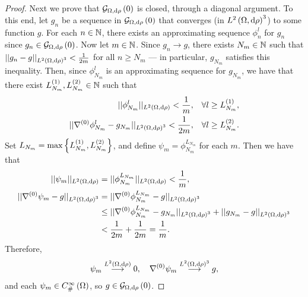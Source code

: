 \begin{proof}
	Next we prove that $\mathcal{G}_{ \Omega, \mathrm{d}\rho}\left( 0 \right)$ is closed, through a diagonal argument.
	To this end, let $g_n$ be a sequence in $\mathcal{G}_{ \Omega, \mathrm{d}\rho}\left( 0 \right)$ that converges (in $L^{2}\left( \Omega,\mathrm{d} \rho \right)^3$) to some function $g$.
	For each $n\in\mathbb{N}$, there exists an approximating sequence $\phi_n^l$ for $g_n$ since $g_n\in\mathcal{G}_{ \Omega, \mathrm{d}\rho}\left( 0 \right)$.
	Now let $m\in\mathbb{N}$.
	Since $g_n\rightarrow g$, there exists $N_m\in\mathbb{N}$ such that $\lvert\lvert g_n-g \rvert\rvert_{L^{2}\left( \Omega,\mathrm{d} \rho \right)^3}<\frac{1}{2m}$ for all $n\geq N_m$ --- in particular, $g_{N_m}$ satisfies this inequality.
	Then, since $\phi_{N_m}^l$ is an approximating sequence for $g_{N_m}$, we have that there exist $L_{N_m}^{(1)}, L_{N_m}^{(2)}\in\mathbb{N}$ such that
	\begin{align*}
		\lvert\lvert \phi_{N_m}^l \rvert\rvert_{L^{2}\left( \Omega,\mathrm{d} \rho \right)} < \frac{1}{m}, &\quad\forall l\geq L_{N_m}^{(1)}, \\
		\lvert\lvert \nabla^{(0)}\phi_{N_m}^l - g_{N_m} \rvert\rvert_{L^{2}\left( \Omega,\mathrm{d} \rho \right)^3} < \frac{1}{2m}, &\quad\forall l\geq L_{N_m}^{(2)}.
	\end{align*}	 
	Set $L_{N_m} = \max\left\{  L_{N_m}^{(1)}, L_{N_m}^{(2)}  \right\}$, and define $\psi_m = \phi^{L_{N_m}}_{N_m}$ for each $m$.
	Then we have that
	\begin{align*}
		\lvert\lvert \psi_m \rvert\rvert_{L^{2}\left( \Omega,\mathrm{d} \rho \right)} &= \lvert\lvert \phi_{N_m}^{L_{N_m}} \rvert\rvert_{L^{2}\left( \Omega,\mathrm{d} \rho \right)} < \frac{1}{m}, \\
		\lvert\lvert \nabla^{(0)}\psi_m - g \rvert\rvert_{L^{2}\left( \Omega,\mathrm{d} \rho \right)^3} &= \lvert\lvert \nabla^{(0)}\phi_{N_m}^{L_{N_m}} - g \rvert\rvert_{L^{2}\left( \Omega,\mathrm{d} \rho \right)^3} \\
		&\leq \lvert\lvert \nabla^{(0)}\phi_{N_m}^{L_{N_m}} - g_{N_m} \rvert\rvert_{L^{2}\left( \Omega,\mathrm{d} \rho \right)^3} + \lvert\lvert g_{N_m} - g \rvert\rvert_{L^{2}\left( \Omega,\mathrm{d} \rho \right)^3} \\
		&< \frac{1}{2m} + \frac{1}{2m} = \frac{1}{m}.
	\end{align*}
	Therefore,
	\begin{align*}
		\psi_m \overset{L^{2}\left( \Omega,\mathrm{d} \rho \right)}{\longrightarrow} 0, \quad \nabla^{(0)}\psi_m \overset{L^{2}\left( \Omega,\mathrm{d} \rho \right)^3}{\longrightarrow} g,
	\end{align*}
	and each $\psi_m\in C^{\infty}_{\#}\left( \Omega \right)$, so $g\in\mathcal{G}_{ \Omega, \mathrm{d}\rho}\left( 0 \right)$.
\end{proof}

